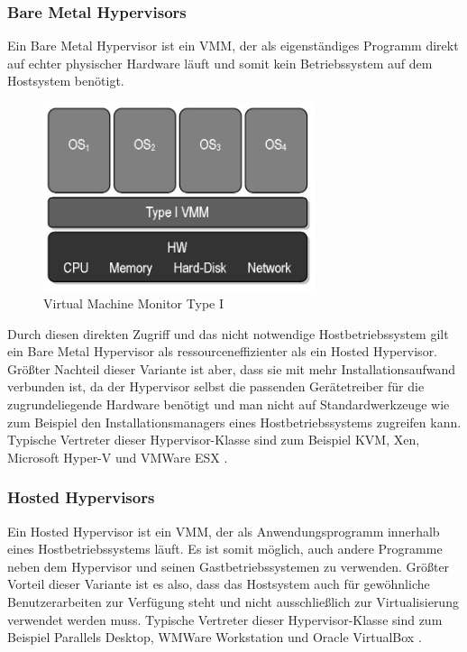 \subsubsection{Bare Metal Hypervisors}

Ein Bare Metal Hypervisor ist ein \ac{VMM}, der als eigenständiges Programm direkt auf echter physischer Hardware läuft und somit kein Betriebssystem auf dem Hostsystem benötigt.

\begin{figure}[!ht]
  \begin{center}
    \includegraphics[width=8cm]{bilder/VMM-Type1.jpg}
    \caption{Virtual Machine Monitor Type I \citep{wiki:002}}
  \end{center}
\end{figure}

Durch diesen direkten Zugriff und das nicht notwendige Hostbetriebssystem gilt ein Bare Metal Hypervisor als ressourceneffizienter als ein Hosted Hypervisor. Größter Nachteil dieser Variante ist aber, dass sie mit mehr Installationsaufwand verbunden ist, da der Hypervisor selbst die passenden Gerätetreiber für die zugrundeliegende Hardware benötigt und man nicht auf Standardwerkzeuge wie zum Beispiel den Installationsmanagers eines Hostbetriebssystems zugreifen kann. Typische Vertreter dieser Hypervisor-Klasse sind zum Beispiel KVM, Xen, Microsoft Hyper-V und VMWare ESX \citep{wiki:004}.

\subsubsection{Hosted Hypervisors}

Ein Hosted Hypervisor ist ein \ac{VMM}, der als Anwendungsprogramm innerhalb eines Hostbetriebssystems läuft. Es ist somit möglich, auch andere Programme neben dem Hypervisor und seinen Gastbetriebssystemen zu verwenden. Größter Vorteil dieser Variante ist es also, dass das Hostsystem auch für gewöhnliche Benutzerarbeiten zur Verfügung steht und nicht ausschließlich zur Virtualisierung verwendet werden muss. Typische Vertreter dieser Hypervisor-Klasse sind zum Beispiel Parallels Desktop, WMWare Workstation und Oracle VirtualBox \citep{wiki:004}.

